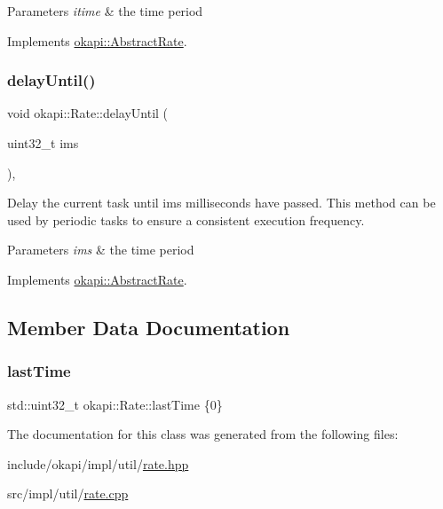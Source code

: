 \begin{DoxyParams}{Parameters}
{\em itime} & the time period \\
\hline
\end{DoxyParams}


Implements \mbox{\hyperlink{classokapi_1_1AbstractRate_a53a15074ca3bd0787ce34d30c068d9b2}{okapi\+::\+Abstract\+Rate}}.

\mbox{\label{classokapi_1_1Rate_a0d31416c85408d63830cceaa07aff1e0}} 
\subsubsection{\texorpdfstring{delayUntil()}{delayUntil()}\hspace{0.1cm}{\footnotesize\ttfamily [2/2]}}
{\footnotesize\ttfamily void okapi\+::\+Rate\+::delay\+Until (\begin{DoxyParamCaption}\item[{uint32\+\_\+t}]{ims }\end{DoxyParamCaption})\hspace{0.3cm}{\ttfamily [override]}, {\ttfamily [virtual]}}

Delay the current task until ims milliseconds have passed. This method can be used by periodic tasks to ensure a consistent execution frequency.


\begin{DoxyParams}{Parameters}
{\em ims} & the time period \\
\hline
\end{DoxyParams}


Implements \mbox{\hyperlink{classokapi_1_1AbstractRate_a3faf54ea2951ae5e0567cd50ddba0227}{okapi\+::\+Abstract\+Rate}}.



\subsection{Member Data Documentation}
\mbox{\label{classokapi_1_1Rate_aec1dbde3c1139531b48a035e9041e61b}} 
\subsubsection{\texorpdfstring{lastTime}{lastTime}}
{\footnotesize\ttfamily std\+::uint32\+\_\+t okapi\+::\+Rate\+::last\+Time \{0\}\hspace{0.3cm}{\ttfamily [protected]}}



The documentation for this class was generated from the following files\+:\begin{DoxyCompactItemize}
\item 
include/okapi/impl/util/\mbox{\hyperlink{rate_8hpp}{rate.\+hpp}}\item 
src/impl/util/\mbox{\hyperlink{rate_8cpp}{rate.\+cpp}}\end{DoxyCompactItemize}
